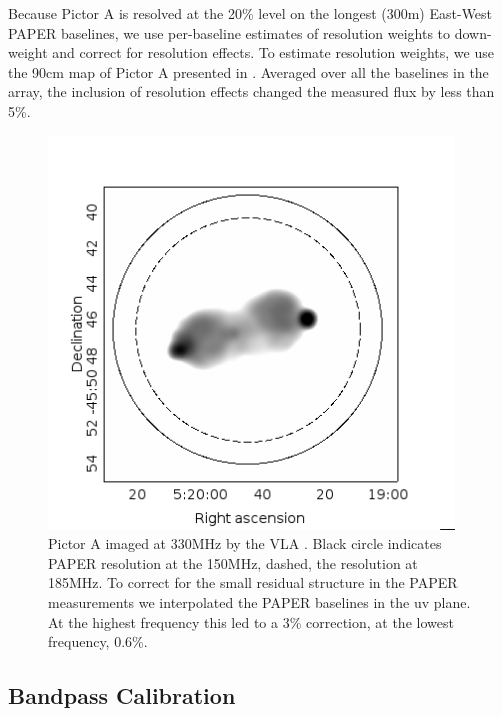 \documentclass[preprint]{aastex}
\begin{document}
Because Pictor A is resolved at the 20\% level on the longest (300m) East-West PAPER baselines, we 
use per-baseline estimates of resolution weights to down-weight and correct for resolution effects.  To estimate
resolution weights, we use the 90cm map of Pictor A presented in \citet{perley_et_al1997}.  Averaged over all
the baselines in the array, the inclusion of resolution effects changed the measured flux by less than 5\%.


\begin{figure}
\includegraphics[width=0.96\textwidth]{plots/picA_Perley.png}
\caption{
Pictor A imaged at 330MHz by the VLA \citep{Perley:1997p9312}. Black circle
indicates PAPER resolution at the 150MHz, dashed, the resolution at 185MHz.  To
correct for the small residual structure in the PAPER measurements we
interpolated the PAPER baselines in the uv plane. At the highest frequency this
led to a 3\% correction, at the lowest frequency, 0.6\%.
\label{fig:pic_perley}}
\end{figure}

\subsection{Bandpass Calibration}
\label{sec:Calibration}
\end{document}
